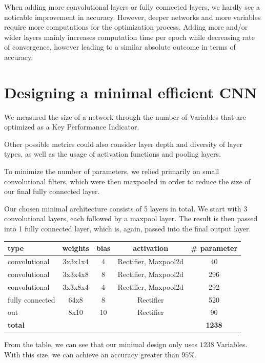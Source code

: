 \documentclass{article}
\begin{document}
When adding more convolutional layers or fully connected layers, we hardly see a noticable improvement in accuracy. However, deeper networks and more variables require more computations for the optimization process. Adding more and/or wider layers mainly increases computation time per epoch while decreasing rate of convergence, however leading to a similar absolute outcome in terms of accuracy.


\section{Designing a minimal efficient CNN}

We measured the size of a network through the number of Variables that are optimized as a Key Performance Indicator.

Other possible metrics could also consider layer depth and diversity of layer types, as well as the usage of activation functions and pooling layers.

 To minimize the number of parameters, we relied primarily on small convolutional filters, which were then maxpooled in order to reduce the size of our final fully connected layer.

Our chosen minimal architecture consists of 5 layers in total. We start with 3 convolutional layers, each followed by a maxpool layer. The result is then passed into 1 fully connected layer, which is, again, passed into the final output layer.

\begin{center}
\begin{tabular}{l c c c c}
 \textbf{type} & \textbf{weights} & \textbf{bias} & \textbf{activation} & \textbf{\# parameter} \\
\midrule
convolutional & 3x3x1x4 & 4  & Rectifier, Maxpool2d & 40 \\
convolutional & 3x3x4x8 & 8 & Rectifier, Maxpool2d & 296 \\
convolutional & 3x3x8x4 & 4 & Rectifier, Maxpool2d & 292 \\
fully connected & 64x8 & 8 & Rectifier & 520 \\
out & 8x10 & 10 & Rectifier & 90 \\
\midrule
\textbf{total} & & & & \textbf{1238}
\end{tabular}
\end{center}

From the table, we can see that our minimal design only uses $1238$ Variables. With this size, we can achieve an accuracy greater than $95\%$. 
\end{document}

